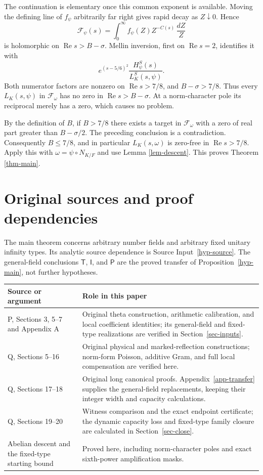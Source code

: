 \documentclass[11pt,a4paper]{article}
\theoremstyle{remark}\newtheorem{remark}[theorem]{Remark}
\newcommand{\Rea}{\operatorname{Re}}
\newcommand{\Packet}{\mathscr F_\omega}
\numberwithin{equation}{section}
\begin{document}
The continuation is elementary once this common exponent is
available. Moving the defining line of $f_\psi$ arbitrarily far
right gives rapid decay as $Z\downarrow0$. Hence
\[
 \mathcal F_\psi(s)=\int_0^\infty
       f_\psi(Z)Z^{-C(s)}\,\frac{dZ}{Z}
\]
is holomorphic on $\Rea s>B-\sigma$.
Mellin inversion, first on $\Rea s=2$, identifies it with
\[
 e^{(s-5/6)^2}\frac{H_\psi^S(s)}{L_K^S(s,\psi)}.
\]
Both numerator factors are nonzero on $\Rea s>7/8$, and
$B-\sigma>7/8$. Thus every $L_K(s,\psi)$ in $\Packet$
has no zero in $\Rea s>B-\sigma$. At a norm-character
pole its reciprocal merely has a zero, which causes no
problem.

By the definition of $B$, if $B>7/8$ there exists a target
in $\Packet$ with a zero of real part greater than
$B-\sigma/2$. The preceding conclusion is a contradiction.
Consequently $B\le7/8$, and in particular
$L_K(s,\omega)$ is zero-free in $\Rea s>7/8$.
Apply this with $\omega=\psi\circ N_{K/F}$ and use
Lemma \ref{lem-descent}. This proves Theorem \ref{thm-main}.

\section{Original sources and proof dependencies}\label{sec-scope}

The main theorem concerns arbitrary number fields and arbitrary
fixed unitary infinity types. Its analytic source dependence is
Source Input~\ref{hyp-source}. The general-field conclusions
$\mathsf T$, $\mathsf I$, and $\mathsf P$ are the proved transfer
of Proposition~\ref{hyp-main}, not further hypotheses.

\begin{center}
\begin{tabular}{>{\raggedright\arraybackslash}p{.45\linewidth}
                >{\raggedright\arraybackslash}p{.46\linewidth}}
\toprule
Source or argument & Role in this paper\\
\midrule
P, Sections 3, 5--7 and Appendix A
& Original theta construction, arithmetic calibration, and local
coefficient identities; its general-field and fixed-type
realizations are verified in Section~\ref{sec-inputs}.\\
Q, Sections 5--16
& Original physical and marked-reflection constructions;
norm-form Poisson, additive Gram, and full local compensation
are verified here.\\
Q, Sections 17--18
& Original long canonical proofs. Appendix~\ref{app-transfer}
supplies the general-field replacements, keeping their integer
width and capacity calculations.\\
Q, Sections 19--20
& Witness comparison and the exact endpoint certificate;
the dynamic capacity loss and fixed-type family closure are
calculated in Section~\ref{sec-close}.\\
Abelian descent and the fixed-type starting bound
& Proved here, including norm-character poles and exact
sixth-power amplification masks.\\
\bottomrule
\end{tabular}
\end{center}
\end{document}
